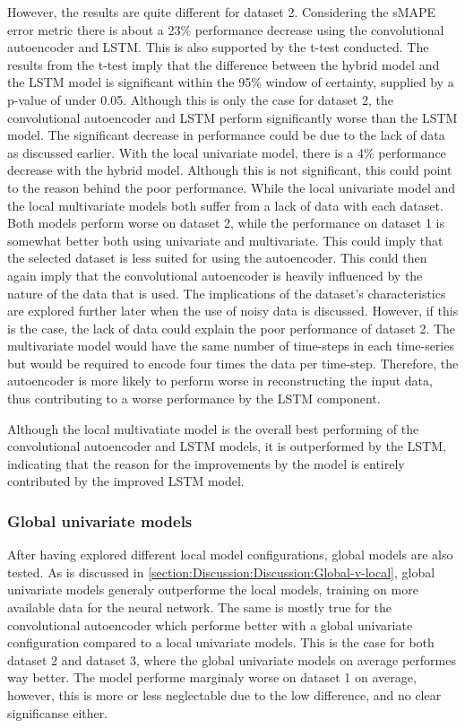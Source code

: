 However, the results are quite different for dataset 2.
Considering the sMAPE error metric there is about a 23\% performance decrease using the convolutional autoencoder and LSTM.
This is also supported by the t-test conducted. The results from the t-test imply that the difference between the hybrid model and the LSTM model
is significant within the 95\% window of certainty, supplied by a p-value of under 0.05.
Although this is only the case for dataset 2, the convolutional autoencoder and LSTM perform significantly worse than the LSTM model.
The significant decrease in performance could be due to the lack of data as discussed earlier.
With the local univariate model, there is a 4\% performance decrease with the hybrid model.
Although this is not significant, this could point to the reason behind the poor performance.
While the local univariate model and the local multivariate models both suffer from a lack of data with each dataset.
Both models perform worse on dataset 2, while the performance on dataset 1 is somewhat better both using univariate and multivariate.
This could imply that the selected dataset is less suited for using the autoencoder.
This could then again imply that the convolutional autoencoder is heavily influenced by the nature of the data that is used.
The implications of the dataset's characteristics are explored further later when the use of noisy data is discussed.
However, if this is the case, the lack of data could explain the poor performance of dataset 2.
The multivariate model would have the same number of time-steps in each time-series but would be required to encode four times the data per time-step.
Therefore, the autoencoder is more likely to perform worse in reconstructing the input data,
thus contributing to a worse performance by the LSTM component.


Although the local multivatiate model is the overall best performing of the convolutional autoencoder and LSTM models,
it is outperformed by the LSTM, indicating that the reason for the improvements by the model
is entirely contributed by the improved LSTM model.


\subsubsection{Global univariate models}


After having explored different local model configurations,
global models are also tested.
As is discussed in \cref{section:Discussion:Discussion:Global-v-local},
global univariate models generaly outperforme the local models, training on more available data for the neural network.
The same is mostly true for the convolutional autoencoder which performe better with a global univariate configuration compared to a local univariate models.
This is the case for both dataset 2 and dataset 3, where the global univariate models on average performes way better.
The model performe marginaly worse on dataset 1 on average, however, this is more or less neglectable due to the low difference, and no clear significanse either.

